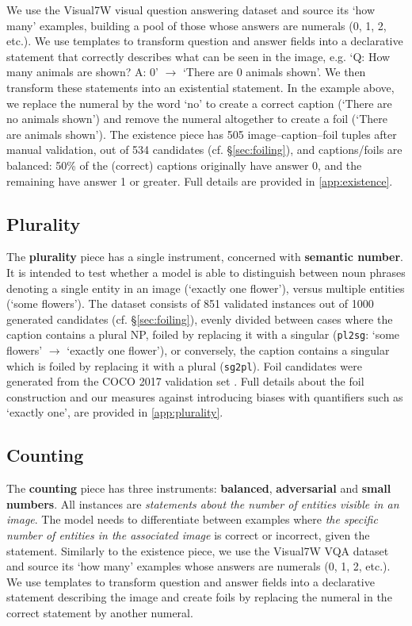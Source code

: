 \documentclass[11pt]{article}
\begin{document}
We use the Visual7W visual question answering dataset \citep{zhu2016cvpr} and source its `how many' examples, building a pool of those whose answers are numerals (0, 1, 2, etc.).
We use
templates
to transform question and answer fields into a declarative statement that correctly describes what can be seen in the image, e.g.
`Q: How many animals are shown? A: 0' $\rightarrow$ `There are 0 animals shown'.
We then transform these statements into an existential statement. In the example above, we replace the numeral by the word `no' to create a correct caption
(`There are no animals shown')
and remove the numeral altogether to create a foil
(`There are animals shown').
The existence piece has
505 image--caption--foil tuples after manual validation, out of 534 candidates (cf. \S \ref{sec:foiling}),
and captions/foils are balanced: 50\% of the (correct) captions originally have answer 0, and the remaining have answer 1 or greater.
Full details are provided in \ref{app:existence}.



\subsection{Plurality}
The \textbf{plurality} piece has a single instrument, concerned with {\bf semantic number}. It is intended to test whether a model is able to distinguish between noun phrases denoting a single entity in an image (`exactly one flower'), versus multiple entities (`some flowers'). The dataset consists of
851 validated instances out of 1000 generated candidates (cf. \S \ref{sec:foiling}),
evenly divided between cases where the caption contains a plural NP, foiled by replacing it with a singular ({\tt pl2sg}: `some flowers' $\rightarrow$ `exactly one flower'), or conversely, the caption contains a singular which is foiled by replacing it with a plural ({\tt sg2pl}). 
Foil candidates were generated from the COCO 2017 validation set \cite{Chen2015}.
Full details about the foil construction and our measures against introducing biases with quantifiers such as `exactly one', are provided in \ref{app:plurality}.

\subsection{Counting}\label{subsec:counting}
The {\bf counting} piece has three instruments: {\bf balanced}, {\bf adversarial} and {\bf small numbers}.
All instances are \textit{statements about the number of entities visible in an image}.
The model needs to differentiate between examples where \textit{the specific number of entities in the associated image} is correct or incorrect, given the statement.
Similarly to the existence piece, we use the Visual7W VQA dataset \citep{zhu2016cvpr} and source its `how many' examples whose answers are numerals (0, 1, 2, etc.).
We use 
templates
to transform question and answer fields into a declarative statement describing the image and create foils by replacing the numeral in the correct statement by another numeral.
\end{document}
